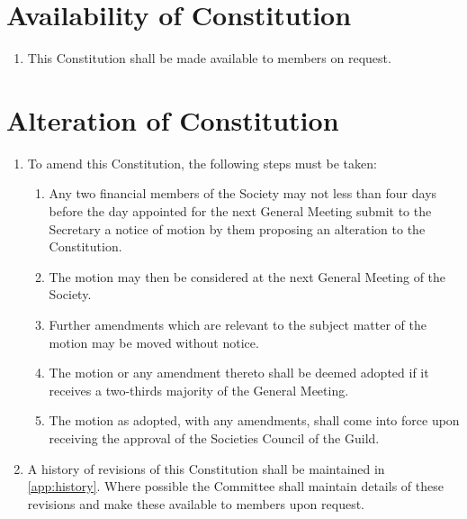 \documentclass[a4paper]{article}
\newenvironment{enumsection}[1]{\section{#1} \begin{enumerate}[ref=\thesection.\theenumi]}{\end{enumerate}}
\begin{document}
\begin{enumsection}{Availability of Constitution}
    \item This Constitution shall be made available to members on request.
\end{enumsection}


\begin{enumsection}{Alteration of Constitution}
    \item To amend this Constitution, the following steps must be taken:
    \begin{enumerate}
        \item Any two financial members of the Society may not less than four days before the day appointed for the next General Meeting submit to the Secretary a notice of motion by them proposing an alteration to the Constitution.
        \item The motion may then be considered at the next General Meeting of the Society.
        \item Further amendments which are relevant to the subject matter of the motion may be moved without notice.
        \item The motion or any amendment thereto shall be deemed adopted if it receives a two-thirds majority of the General Meeting.
        \item The motion as adopted, with any amendments, shall come into force upon receiving the approval of the Societies Council of the Guild.
    \end{enumerate}
    \item A history of revisions of this Constitution shall be maintained in \cref{app:history}. Where possible the Committee shall maintain details of these revisions and make these available to members upon request.
\end{enumsection}
\end{document}
